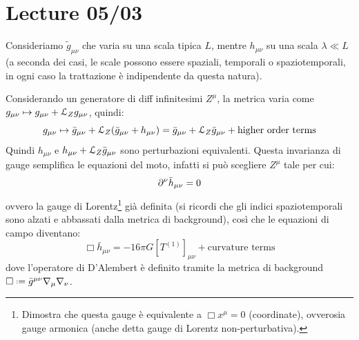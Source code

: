 \chapter{Lecture 05/03}

Consideriamo $ \tilde{g}_{\mu \nu} $ che varia su una scala tipica $ L $, mentre $ h_{\mu \nu} $ su una scala $ \lambda \ll L $ (a seconda dei casi, le scale possono essere spaziali, temporali o spaziotemporali, in ogni caso la trattazione è indipendente da questa natura).

Considerando un generatore di diff infinitesimi $ Z^\mu $, la metrica varia come $ g_{\mu \nu} \mapsto g_{\mu \nu} + \EuScript{L}_Z g_{\mu \nu} $, quindi:
\begin{equation*}
  g_{\mu \nu} \mapsto \bar{g}_{\mu \nu} + \EuScript{L}_Z (\bar{g}_{\mu \nu} + h_{\mu \nu}) = \bar{g}_{\mu \nu} + \EuScript{L}_Z \bar{g}_{\mu \nu} + \text{higher order terms}
\end{equation*}
Quindi $ h_{\mu \nu} $ e $ h_{\mu \nu} + \EuScript{L}_Z \bar{g}_{\mu \nu} $ sono perturbazioni equivalenti. Questa invarianza di gauge semplifica le equazioni del moto, infatti si può scegliere $ Z^\mu $ tale per cui:
\begin{equation}
  \partial^\nu \bar{h}_{\mu \nu} = 0
\end{equation}
ovvero la gauge di Lorentz\footnote{Dimostra che questa gauge è equivalente a $ \Box x^\mu = 0 $ (coordinate), ovverosia gauge armonica (anche detta gauge di Lorentz non-perturbativa).} già definita (si ricordi che gli indici spaziotemporali sono alzati e abbassati dalla metrica di background), così che le equazioni di campo diventano:
\begin{equation}
  \Box \bar{h}_{\mu \nu} = - 16\pi G [T^{(1)}]_{\mu \nu} + \text{curvature terms}
\end{equation}
dove l'operatore di D'Alembert è definito tramite la metrica di background $ \Box \defeq \bar{g}^{\mu \nu} \na_\mu \na_\nu $.

